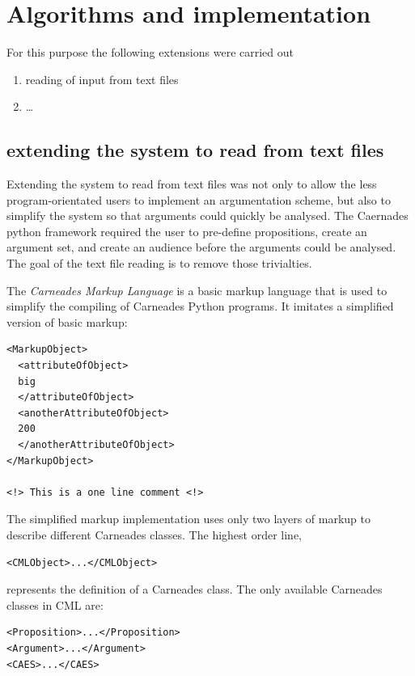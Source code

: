 \documentclass[10pt,a4paper,twocolumn]{article}
\begin{document}
\section{Algorithms and implementation}

For this purpose the following extensions were carried out
\begin{enumerate}
\item reading of input from text files
\item \dots
\end{enumerate}

\subsection{extending the system to read from text files}

Extending the system to read from text files was not only to allow the less
program-orientated users to implement an argumentation scheme, but also to
simplify the system so that arguments could quickly be analysed. The Caernades
python framework required the user to pre-define propositions, create an
argument set, and create an audience before the arguments could be analysed. The
goal of the text file reading is to remove those trivialties.

The \textit{Carneades Markup Language} is a basic markup language that is used 
to simplify the compiling of Carneades Python programs. It imitates a 
simplified version of basic markup:

\begin{lstlisting}
<MarkupObject>
  <attributeOfObject>
  big
  </attributeOfObject>
  <anotherAttributeOfObject>
  200
  </anotherAttributeOfObject>
</MarkupObject>

<!> This is a one line comment <!>
\end{lstlisting}


The simplified markup implementation uses only two layers of markup to describe different Carneades classes. The highest order line,

\begin{lstlisting}
<CMLObject>...</CMLObject>
\end{lstlisting}

represents the definition of a Carneades class. The only available Carneades classes in CML are:

\begin{lstlisting}
<Proposition>...</Proposition>
<Argument>...</Argument>
<CAES>...</CAES>
\end{lstlisting}
\end{document}

